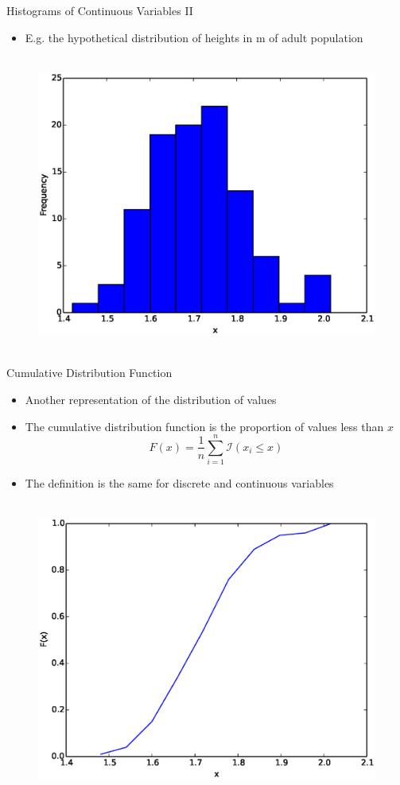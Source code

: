 \documentclass{beamer}
\begin{document}
\begin{frame}{Histograms of Continuous Variables II} 
\begin{itemize}
 \item E.g. the hypothetical distribution of heights in m of adult population  
\end{itemize}
\begin{figure}[htp]
\mbox{
\includegraphics[width=0.5\linewidth]{ContinuousHist.eps}
}
\end{figure} 
\end{frame}

\begin{frame}{Cumulative Distribution Function}  
\begin{itemize} 
 \item Another representation of the distribution of values 
\item The cumulative distribution function is the proportion of values less than $x$
\begin{displaymath}
 F(x) = \frac{1}{n}\sum_{i=1}^n \mathcal{I}(x_i \leq x)
\end{displaymath}
\item The definition is the same for discrete and continuous variables 
\end{itemize}
 \begin{figure}[htp]
\mbox{
\includegraphics[width=0.5\linewidth]{ContinuousCDF.eps}
}
\end{figure} 
\end{frame}
\end{document}
